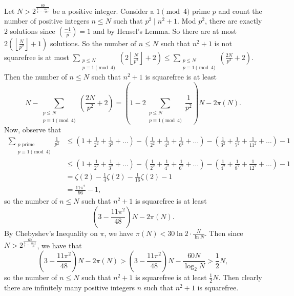 Let $N>2^{\frac{60}{\frac{5}{2}-\frac{11\pi^2}{48}}}$ be a positive integer. Consider a $1\pmod4$ prime $p$ and count the number of positive integers $n\leq N$ such that $p^2\mid n^2+1$. Mod $p^2$, there are exactly $2$ solutions since $\left(\frac{-1}{p}\right)=1$ and by Hensel's Lemma. So there are at most $2\left(\left\lfloor\frac{N}{p^2}\right\rfloor+1\right)$ solutions. So the number of $n\leq N$ such that $n^2+1$ is not squarefree is at most $\displaystyle\sum_{\substack{p\leq N \\ p\equiv1\pmod4}}\left(2\left\lfloor\frac{N}{p^2}\right\rfloor+2\right)\leq\displaystyle\sum_{\substack{p\leq N \\ p\equiv1\pmod4}}\left(\frac{2N}{p^2}+2\right)$. Then the number of $n\leq N$ such that $n^2+1$ is squarefree is at least \[N-\displaystyle\sum_{\substack{p\leq N \\ p\equiv1\pmod4}}\left(\frac{2N}{p^2}+2\right)=\left(1-2\displaystyle\sum_{\substack{p\leq N \\ p\equiv1\pmod4}}\frac{1}{p^2}\right)N-2\pi\left(N\right).\] Now, observe that
\begin{align*}
	\displaystyle\sum_{\substack{p\text{ prime}\\ p\equiv1\pmod4}}\frac{1}{p^2}&\leq\left(1+\frac{1}{2^2}+\frac{1}{3^2}+\ldots\right)-\left(\frac{1}{2^2}+\frac{1}{4^2}+\frac{1}{6^2}+\ldots\right)-\left(\frac{1}{3^2}+\frac{1}{7^2}+\frac{1}{11^2}+\ldots\right)-1\\
	&\leq\left(1+\frac{1}{2^2}+\frac{1}{3^2}+\ldots\right)-\left(\frac{1}{2^2}+\frac{1}{4^2}+\frac{1}{6^2}+\ldots\right)-\left(\frac{1}{4^2}+\frac{1}{8^2}+\frac{1}{12^2}+\ldots\right)-1\\
	&=\zeta\left(2\right)-\frac{1}{4}\zeta\left(2\right)-\frac{1}{16}\zeta\left(2\right)-1\\
	&=\frac{11\pi^2}{96}-1,
\end{align*}
so the number of $n\leq N$ such that $n^2+1$ is squarefree is at least \[\left(3-\frac{11\pi^2}{48}\right)N-2\pi\left(N\right).\] By Chebyshev's Inequality on $\pi$, we have $\pi\left(N\right)<30\ln2\cdot\frac{N}{\ln N}$. Then since $N>2^{\frac{60}{\frac{5}{2}-\frac{11\pi^2}{48}}}$, we have that \[\left(3-\frac{11\pi^2}{48}\right)N-2\pi\left(N\right)>\left(3-\frac{11\pi^2}{48}\right)N-\frac{60N}{\log_2N}>\frac{1}{2}N,\] so the number of $n\leq N$ such that $n^2+1$ is squarefree is at least $\frac{1}{2}N$. Then clearly there are infinitely many positive integers $n$ such that $n^2+1$ is squarefree.